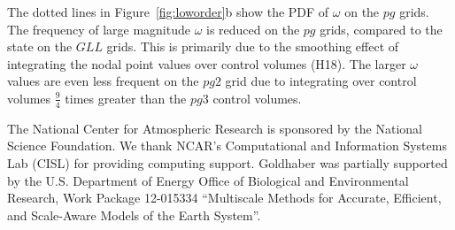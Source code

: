\documentclass{agujournal}
\begin{document}
The dotted lines in Figure~\ref{fig:loworder}b show the PDF of $\omega$ on the $pg$ grids. The frequency of large magnitude $\omega$ is reduced on the $pg$ grids, compared to the state on the $GLL$ grids. This is primarily due to the smoothing effect of integrating the nodal point values over control volumes (H18). The larger $\omega$ values are even less frequent on the $pg2$ grid due to integrating over control volumes $\frac{9}{4}$ times greater than the $pg3$ control volumes. 


%
%
%
%
%
%
%

\acknowledgments
The National Center for Atmospheric Research is sponsored by the National Science Foundation.  We thank NCAR's Computational and Information Systems Lab (CISL) for providing computing support. Goldhaber was partially supported by the U.S. Department of Energy Office of Biological and Environmental Research, Work Package 12-015334 ``Multiscale Methods for Accurate, Efficient, and Scale-Aware Models of the Earth System''.





\end{document}
